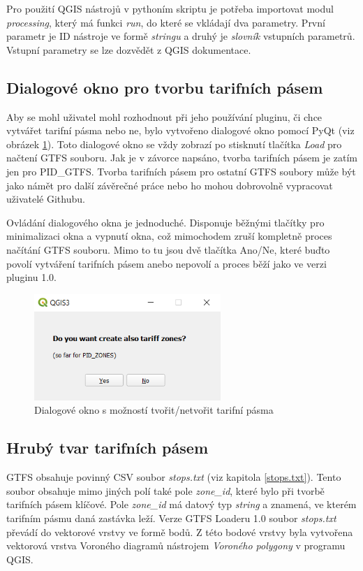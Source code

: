 Pro použití QGIS nástrojů v pythoním skriptu je potřeba importovat modul \textit{processing},
který má funkci \textit{run}, do které se vkládají dva parametry. První parametr je ID nástroje
ve formě \textit{stringu} a druhý je \textit{slovník} vstupních parametrů. Vstupní parametry se lze dozvědět
z QGIS dokumentace. \cite{QGIS_docs}

\subsection{Dialogové okno pro tvorbu tarifních pásem}

Aby se mohl uživatel mohl rozhodnout při jeho používání pluginu, či chce vytvářet tarifní pásma nebo ne, bylo vytvořeno
dialogové okno pomocí PyQt (viz obrázek \ref{fig:dialog}). Toto dialogové okno se vždy zobrazí po stisknutí tlačítka
\textit{Load} pro načtení GTFS souboru. Jak je v závorce napsáno, tvorba tarifních pásem je zatím jen pro PID\_GTFS.
Tvorba tarifních pásem pro ostatní GTFS soubory může být jako námět pro další závěrečné práce nebo ho mohou dobrovolně
vypracovat uživatelé Githubu.

Ovládání dialogového okna je jednoduché. Disponuje běžnými tlačítky pro minimalizaci okna a vypnutí okna, což mimochodem
zruší kompletně proces načítání GTFS souboru. Mimo to tu jsou dvě tlačítka Ano/Ne, které buďto povolí vytváření tarifních
pásem anebo nepovolí a proces běží jako ve verzi pluginu 1.0.

\begin{figure}[H] \centering
    \includegraphics[width=200pt]{./pictures/dialog.png}
    \caption[Dialogové okno s možností tvořit/netvořit tarifní pásma]{Dialogové okno s možností tvořit/netvořit tarifní pásma}
	\label{fig:dialog}                                
\end{figure} 

\subsection{Hrubý tvar tarifních pásem}

GTFS obsahuje povinný CSV soubor \textit{stops.txt} (viz kapitola \ref{stops.txt}). Tento soubor obsahuje mimo
jiných polí také pole \textit{zone\_id}, které bylo při tvorbě tarifních pásem klíčové. 
Pole \textit{zone\_id} má datový typ \textit{string} a znamená, ve kterém tarifním
pásmu daná zastávka leží. Verze GTFS Loaderu 1.0 soubor \textit{stops.txt} převádí do vektorové vrstvy
ve formě bodů. Z této bodové vrstvy byla vytvořena vektorová vrstva Voroného 
diagramů nástrojem \textit{Voroného polygony} v programu QGIS. 


